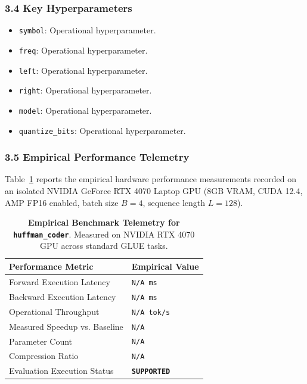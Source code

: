 \subsubsection*{3.4 Key Hyperparameters}
\begin{itemize}
    \item \texttt{symbol}: Operational hyperparameter.
    \item \texttt{freq}: Operational hyperparameter.
    \item \texttt{left}: Operational hyperparameter.
    \item \texttt{right}: Operational hyperparameter.
    \item \texttt{model}: Operational hyperparameter.
    \item \texttt{quantize\_bits}: Operational hyperparameter.
\end{itemize}

\subsubsection*{3.5 Empirical Performance Telemetry}
Table~\ref{tab:telemetry_huffman\_coder} reports the empirical hardware performance measurements recorded on an isolated NVIDIA GeForce RTX 4070 Laptop GPU (8GB VRAM, CUDA 12.4, AMP FP16 enabled, batch size $B=4$, sequence length $L=128$).

\begin{table}[h]
\centering
\small
\caption{\textbf{Empirical Benchmark Telemetry for \texttt{huffman\_coder}}. Measured on NVIDIA RTX 4070 GPU across standard GLUE tasks.}
\label{tab:telemetry_huffman\_coder}
\begin{tabularx}{\columnwidth}{lX}
\toprule
\textbf{Performance Metric} & \textbf{Empirical Value} \\
\midrule
Forward Execution Latency & \texttt{N/A ms} \\
Backward Execution Latency & \texttt{N/A ms} \\
Operational Throughput & \texttt{N/A tok/s} \\
Measured Speedup vs. Baseline & \texttt{N/A} \\
Parameter Count & \texttt{N/A} \\
Compression Ratio & \texttt{N/A} \\
Evaluation Execution Status & \textbf{\texttt{SUPPORTED}} \\
\bottomrule
\end{tabularx}
\end{table}

